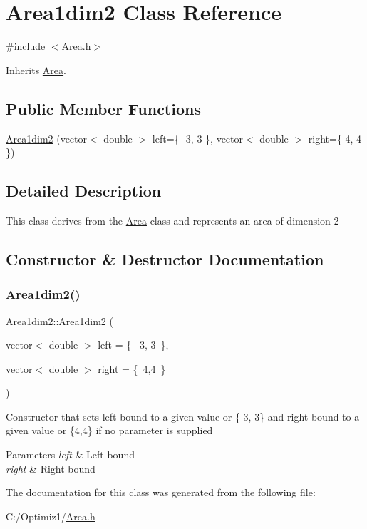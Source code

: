 \hypertarget{class_area1dim2}{}\section{Area1dim2 Class Reference}
\label{class_area1dim2}


{\ttfamily \#include $<$Area.\+h$>$}



Inherits \hyperlink{class_area}{Area}.

\subsection*{Public Member Functions}
\begin{DoxyCompactItemize}
\item 
\hyperlink{class_area1dim2_a02651ad6d3d30c13991674809fbb662a}{Area1dim2} (vector$<$ double $>$ left=\{ -\/3,-\/3 \}, vector$<$ double $>$ right=\{ 4, 4 \})
\end{DoxyCompactItemize}


\subsection{Detailed Description}
This class derives from the \hyperlink{class_area}{Area} class and represents an area of dimension 2 

\subsection{Constructor \& Destructor Documentation}
\mbox{\label{class_area1dim2_a02651ad6d3d30c13991674809fbb662a}} 
\subsubsection{\texorpdfstring{Area1dim2()}{Area1dim2()}}
{\footnotesize\ttfamily Area1dim2\+::\+Area1dim2 (\begin{DoxyParamCaption}\item[{vector$<$ double $>$}]{left = {\ttfamily \{~-\/3,-\/3~\}},  }\item[{vector$<$ double $>$}]{right = {\ttfamily \{~4,4~\}} }\end{DoxyParamCaption})\hspace{0.3cm}{\ttfamily [inline]}}

Constructor that sets left bound to a given value or \{-\/3,-\/3\} and right bound to a given value or \{4,4\} if no parameter is supplied 
\begin{DoxyParams}{Parameters}
{\em left} & Left bound \\
\hline
{\em right} & Right bound \\
\hline
\end{DoxyParams}


The documentation for this class was generated from the following file\+:\begin{DoxyCompactItemize}
\item 
C\+:/\+Optimiz1/\hyperlink{_area_8h}{Area.\+h}\end{DoxyCompactItemize}
